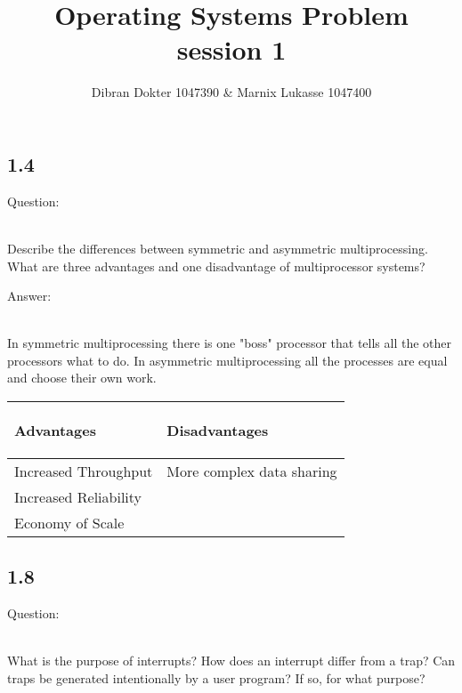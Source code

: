 \documentclass[]{article}
\title{Operating Systems Problem session 1}
\author{Dibran Dokter 1047390 \& Marnix Lukasse 1047400}
\begin{document}
\maketitle

\subsection*{1.4}

\begin{bfseries} Question: \end{bfseries}\\
Describe the differences between symmetric and asymmetric multiprocessing.
What are three advantages and one disadvantage of multiprocessor systems?\\

\begin{bfseries} Answer: \end{bfseries}\\
In symmetric multiprocessing there is one "boss" processor that tells all the other processors what to do. In asymmetric multiprocessing all the processes are equal and choose their own work.\\

\begin{tabular}{|l|l|}
	
	\hline
	\begin{bfseries}Advantages\end{bfseries} & \begin{bfseries}Disadvantages\end{bfseries}\\
	\hline	
	Increased Throughput	& More complex data sharing\\
	Increased Reliability	& \\
	Economy of Scale		& \\
	\hline
	
\end{tabular}

\subsection*{1.8}

\begin{bfseries} Question: \end{bfseries}\\
What is the purpose of interrupts? How does an interrupt differ from a trap? Can traps be generated intentionally by a user program? If so, for what purpose?
\end{document}
